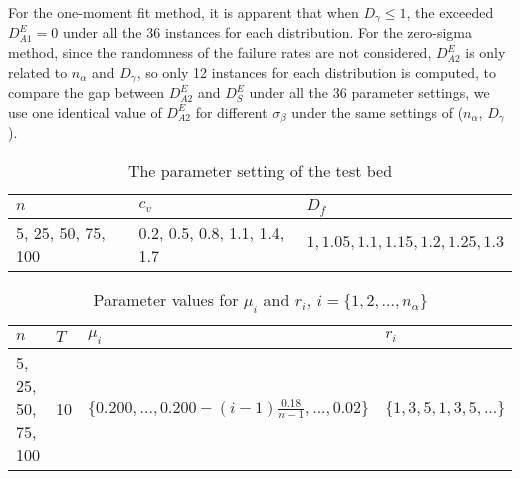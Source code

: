\documentclass[preprint,12pt]{elsarticle}
\begin{document}
For the one-moment fit method, it is apparent that when $D_{\gamma} \leq 1$, the exceeded $D^{E}_{A1} = 0$ under all the 36 instances for each distribution. For the zero-sigma method, since the randomness of the failure rates are not considered, $D^{E}_{A2}$ is only related to $n_{\alpha}$ and $D_{\gamma}$, so only 12 instances for each distribution is computed, to compare the gap between $D^{E}_{A2}$ and $D^{E}_{S}$ under all the 36 parameter settings, we use one identical value of $D^{E}_{A2}$ for different $\sigma_{\beta}$ under the same settings of ($n_{\alpha}$, $D_{\gamma}$).





\begin{table}[htbp]
  \centering
  \caption{The parameter setting of the test bed}
    \begin{tabular}{lll}
    \toprule
  $n$ & $c_{v}$ & $D_{f}$\\
    \midrule
    5, 25, 50, 75, 100 & 0.2, 0.5, 0.8, 1.1, 1.4, 1.7 & $ 1, 1.05, 1.1, 1.15, 1.2, 1.25, 1.3$ \\
  \bottomrule
    \end{tabular}%
  \label{tab:testbedps}%
\end{table}

\begin{table}[htbp]
  \centering
  \caption{Parameter values for $\mu_{i}$ and $r_{i}$, $i=\{1,2,...,n_{\alpha}\}$}
    \begin{tabular}{llll}
    \toprule
    $n$ & $T$ & $\mu_{i}$ &  $r_{i}$\\
    \midrule
    5, 25, 50, 75, 100   &10& $\{0.200,...,0.200-(i-1)\frac{0.18}{n-1},...,0.02\}$ &$\{1,3,5,1,3,5,...\}$\\
    \bottomrule
    \end{tabular}%
  \label{tab:testbedmur}%
\end{table}
\end{document}
